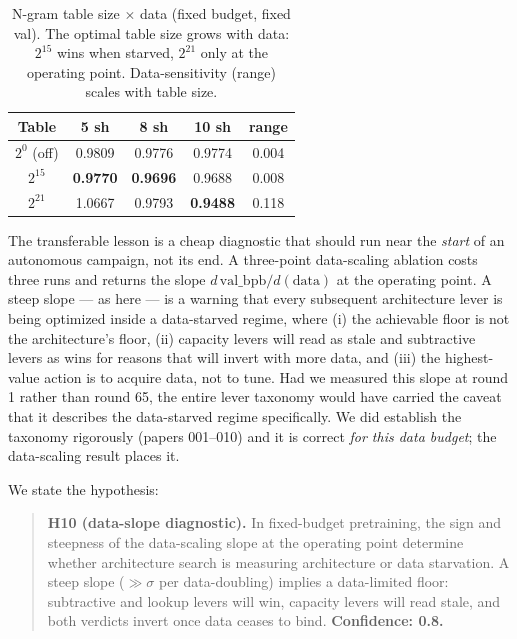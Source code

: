 \documentclass{article}
\newcommand{\valbpb}{\mathrm{val\_bpb}}
\begin{document}
\begin{table}[t]
\caption{N-gram table size $\times$ data (fixed budget, fixed val). The optimal table size grows with data: $2^{15}$ wins when starved, $2^{21}$ only at the operating point. Data-sensitivity (range) scales with table size.}
\label{tab:tablesize}
\vskip 0.1in
\begin{center}
\begin{small}
\begin{tabular}{ccccc}
\toprule
Table & 5 sh & 8 sh & 10 sh & range \\
\midrule
$2^{0}$ (off) & 0.9809 & 0.9776 & 0.9774 & 0.004 \\
$2^{15}$ & \textbf{0.9770} & \textbf{0.9696} & 0.9688 & 0.008 \\
$2^{21}$ & 1.0667 & 0.9793 & \textbf{0.9488} & 0.118 \\
\bottomrule
\end{tabular}
\end{small}
\end{center}
\vskip -0.15in
\end{table}

The transferable lesson is a cheap diagnostic that should run near the \emph{start} of an autonomous campaign, not its end. A three-point data-scaling ablation costs three runs and returns the slope $d\,\valbpb/d(\text{data})$ at the operating point. A steep slope --- as here --- is a warning that every subsequent architecture lever is being optimized inside a data-starved regime, where (i) the achievable floor is not the architecture's floor, (ii) capacity levers will read as stale and subtractive levers as wins for reasons that will invert with more data, and (iii) the highest-value action is to acquire data, not to tune. Had we measured this slope at round 1 rather than round 65, the entire lever taxonomy would have carried the caveat that it describes the data-starved regime specifically. We did establish the taxonomy rigorously (papers 001--010) and it is correct \emph{for this data budget}; the data-scaling result places it.

We state the hypothesis:

\begin{quote}
\textbf{H10 (data-slope diagnostic).} In fixed-budget pretraining, the sign and steepness of the data-scaling slope at the operating point determine whether architecture search is measuring architecture or data starvation. A steep slope ($\gg\sigma$ per data-doubling) implies a data-limited floor: subtractive and lookup levers will win, capacity levers will read stale, and both verdicts invert once data ceases to bind. \textbf{Confidence: 0.8.}
\end{quote}
\end{document}
